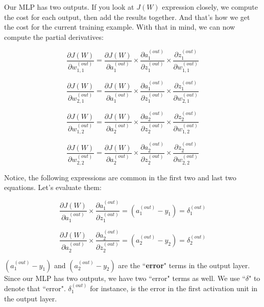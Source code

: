 \documentclass[12pt, letterpaper]{article}
\begin{document}
Our MLP has two outputs. If you look at $J(W)$ expression 
closely, we compute the cost for each output, then add the results
together. And that's how we get the cost for the current training
example. With that in mind, we can now compute the partial
derivatives:

\vspace{5mm} %

\[
    \frac{\partial J(W)}{\partial w_{1,1}^{(out)}} = 
    \frac{\partial J(W)}{\partial a_{1}^{(out)}} \times
    \frac{\partial a_{1}^{(out)}}{\partial z_{1}^{(out)}} \times
    \frac{\partial z_{1}^{(out)}}{\partial w_{1,1}^{(out)}}
\]

\[
    \frac{\partial J(W)}{\partial w_{2,1}^{(out)}} = 
    \frac{\partial J(W)}{\partial a_{1}^{(out)}} \times
    \frac{\partial a_{1}^{(out)}}{\partial z_{1}^{(out)}} \times
    \frac{\partial z_{1}^{(out)}}{\partial w_{2,1}^{(out)}}
\]

\[
    \frac{\partial J(W)}{\partial w_{1,2}^{(out)}} = 
    \frac{\partial J(W)}{\partial a_{2}^{(out)}} \times
    \frac{\partial a_{2}^{(out)}}{\partial z_{2}^{(out)}} \times
    \frac{\partial z_{2}^{(out)}}{\partial w_{1,2}^{(out)}}
\]

\[
    \frac{\partial J(W)}{\partial w_{2,2}^{(out)}} = 
    \frac{\partial J(W)}{\partial a_{2}^{(out)}} \times
    \frac{\partial a_{2}^{(out)}}{\partial z_{2}^{(out)}} \times
    \frac{\partial z_{2}^{(out)}}{\partial w_{2,2}^{(out)}}
\]

\vspace{5mm} %

Notice, the following expressions are common in the first two and
last two equations. Let's evaluate them:

\[
    \frac{\partial J(W)}{\partial a_{1}^{(out)}} \times
    \frac{\partial a_{1}^{(out)}}{\partial z_{1}^{(out)}} = 
    (a_{1}^{(out)} - y_1) = \delta_1^{(out)}
\]

\[
    \frac{\partial J(W)}{\partial a_{2}^{(out)}} \times
    \frac{\partial a_{2}^{(out)}}{\partial z_{2}^{(out)}} = 
    (a_{2}^{(out)} - y_2) = \delta_2^{(out)}
\]

\vspace{5mm} %

$(a_{1}^{(out)} - y_1)$ and $(a_{2}^{(out)} - y_2)$ are the 
``\textbf{error}" terms in the output layer. Since our MLP
has two outputs, we have two ``error" terms as well. We use 
``$\delta$" to denote that ``error". $\delta_1^{(out)}$ for 
instance, is the error in the first activation unit in the 
output layer.
\end{document}

